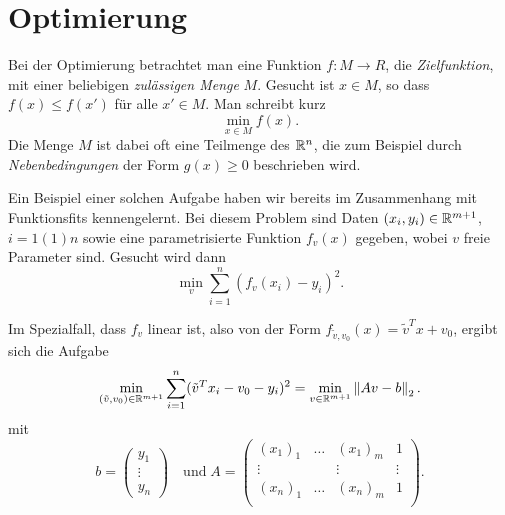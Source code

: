% 

\chapter{Optimierung}

Bei der Optimierung betrachtet man eine Funktion $f:M\to R$, die
\emph{Zielfunktion}, mit einer beliebigen \emph{zulässigen Menge} $M$.
Gesucht ist $x\in M$, so dass $f(x) \le f(x')$ für alle $x'\in M$. Man
schreibt kurz
\begin{equation}
  \label{eq:min}
  \min_{x\in M} f(x).
\end{equation}
Die Menge $M$ ist dabei oft eine Teilmenge des $\mathbb{R}^n$, die zum
Beispiel durch \emph{Nebenbedingungen} der Form $g(x)\ge 0$
beschrieben wird.

Ein Beispiel einer solchen Aufgabe haben wir bereits im Zusammenhang
mit Funktionsfits kennengelernt. Bei diesem Problem sind Daten $(x_i,
y_i)\in\mathbb{R}^{m+1}$, $i=1(1)n$ sowie eine parametrisierte Funktion
$f_v(x)$ gegeben, wobei $v$ freie Parameter sind. Gesucht
wird dann
\begin{equation}
  \label{eq:fit}
  \min_{v} \sum_{i=1}^n (f_v(x_i) - y_i)^2.
\end{equation}

Im Spezialfall, dass $f_v$ linear ist, also von der Form
$f_{\tilde{v},v_0}(x) = \tilde{v}^Tx + v_0$, ergibt sich die Aufgabe
\begin{equation}
  \label{eq:min2}
  \min_{(\tilde{v},v_0)\in\mathbb{R}^{m+1}} \sum_{i=1}^n (\tilde{v}^Tx_i -
  v_0 - y_i)^2 = \min_{v\in\mathbb{R}^{m+1}} \left\lVert{A v - b}\right\rVert_2.
\end{equation}
mit
\begin{equation*}
  b =
  \begin{pmatrix}
    y_1\\
    \vdots\\
    y_n
  \end{pmatrix}
\quad\text{und}\;
A =
\begin{pmatrix}
  (x_1)_1 & \ldots & (x_1)_m & 1\\
  \vdots &        & \vdots & \vdots\\
  (x_n)_1 & \ldots & (x_n)_m & 1\\
\end{pmatrix}.
\end{equation*}

